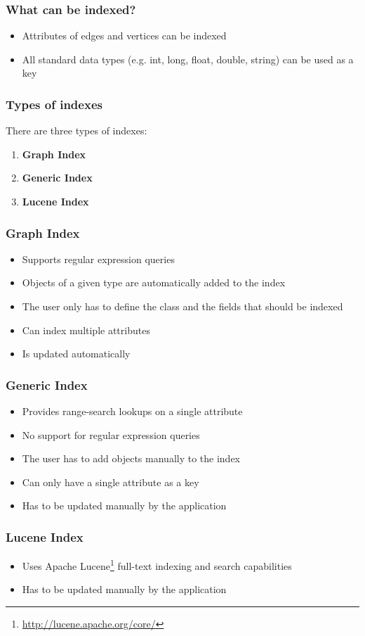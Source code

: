 
\begin{frame}
\frametitle{What can be indexed?}
\begin{itemize}
		\item Attributes of edges and vertices can be indexed
		\item All standard data types (e.g. int, long, float, double, string) can be used as a key		
\end{itemize}
\end{frame} 

\begin{frame}
\frametitle{Types of indexes}
There are three types of indexes:

\begin{enumerate}
	\item \textbf{Graph Index}
	\item \textbf{Generic Index}
	\item \textbf{Lucene Index}
\end{enumerate}
\end{frame} 

\begin{frame}
\frametitle{Graph Index}
\begin{itemize}
	\item Supports regular expression queries \pause
	\item Objects of a given type are automatically added to the index \pause
	\item The user only has to define the class and the fields that should be indexed \pause
	\item Can index multiple attributes \pause
	\item Is updated automatically
\end{itemize}
\end{frame} 

\begin{frame}
\frametitle{Generic Index}
\begin{itemize}
	\item Provides range-search lookups on a single attribute \pause
	\item No support for regular expression queries \pause
	\item The user has to add objects manually to the index \pause
	\item Can only have a single attribute as a key \pause
	\item Has to be updated manually by the application 
\end{itemize}
\end{frame} 

\begin{frame}
\frametitle{Lucene Index}
\begin{itemize}
	\item Uses Apache Lucene\footnote{\url{http://lucene.apache.org/core/}} full-text indexing and search capabilities
	\item Has to be updated manually by the application
\end{itemize}
\end{frame}
